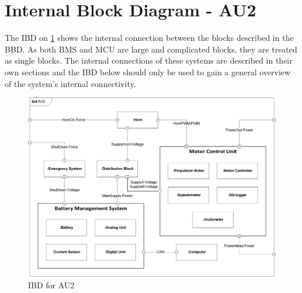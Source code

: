 \section{Internal Block Diagram - AU2}
The IBD on \ref{fig:IBD} shows the internal connection between the blocks described in the BBD. As both BMS and MCU are large and complicated blocks, they are treated as single blocks. The internal connections of these systems are described in their own sections and the IBD below should only be used to gain a general overview of the system's internal connectivity. 

\begin{figure}[H]
	\centering
	\includegraphics[width=1\linewidth]{Architecture/Diagrams/IBD_AU2}
	\caption{IBD for AU2}
	\label{fig:IBD}
\end{figure}